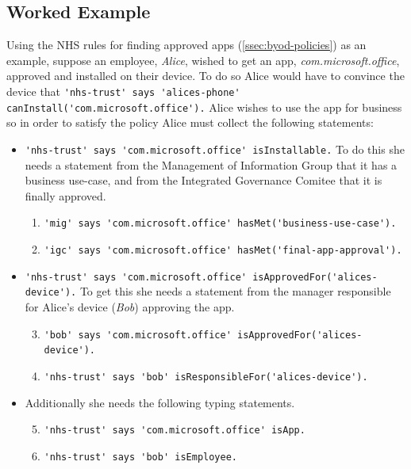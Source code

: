 \documentclass{llncs}
\begin{document}
\subsection{Worked Example}

Using the NHS rules for finding approved apps (\autoref{ssec:byod-policies}) as an example, suppose an employee, \emph{Alice}, wished to get an app, \emph{\ttfamily com.microsoft.office}, approved and installed on their device.
To do so Alice would have to convince the device that \lstinline{'nhs-trust' says 'alices-phone' canInstall('com.microsoft.office').}
Alice wishes to use the app for business so in order to satisfy the policy Alice must collect the following statements:
\begin{itemize}
    \newcommand{\weitemsize}[0]{\footnotesize}
  \item {\weitemsize \lstinline{'nhs-trust' says 'com.microsoft.office' isInstallable.}\newline}
    To do this she needs a statement from the Management of Information Group that it has a business use-case, and from the Integrated Governance Comitee that it is finally approved.
    \begin{enumerate}\setcounter{enumi}{0}
      \item {\weitemsize \lstinline{'mig' says 'com.microsoft.office' hasMet('business-use-case').}}
      \item {\weitemsize \lstinline{'igc' says 'com.microsoft.office' hasMet('final-app-approval').}}
    \end{enumerate}
  \item {\weitemsize \lstinline{'nhs-trust' says 'com.microsoft.office' isApprovedFor('alices-device').}}
    To get this she needs a statement from the manager responsible for Alice's device (\emph{Bob}) approving the app.
    \begin{enumerate}\setcounter{enumi}{2}
      \item {\weitemsize \lstinline{'bob' says 'com.microsoft.office' isApprovedFor('alices-device').}}
      \item {\weitemsize \lstinline{'nhs-trust' says 'bob' isResponsibleFor('alices-device').}}
    \end{enumerate}
  \item Additionally she needs the following typing statements.
    \begin{enumerate}\setcounter{enumi}{4}
      \item {\weitemsize \lstinline{'nhs-trust' says 'com.microsoft.office' isApp.}} \label{item:isapp}
      \item {\weitemsize \lstinline{'nhs-trust' says 'bob' isEmployee.}}
    \end{enumerate}
\end{itemize}
\end{document}
